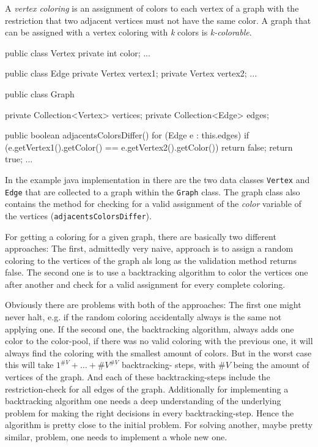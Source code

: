 \documentclass[conference]{IEEEtran}
\begin{document}
A \emph{vertex coloring} is an assignment of colors to each vertex of a graph
with the restriction that two adjacent vertices must not have the same color.
A graph that can be assigned with a vertex coloring with \emph{k} colors is
\emph{k-colorable}.

\begin{javalst}[label=lst:graph_coloring,caption=Graph-coloring example]
public class Vertex {
  private int color;
  ...
}

public class Edge {
  private Vertex vertex1;
  private Vertex vertex2;
  ...
}

public class Graph {
  private Collection<Vertex> vertices;
  private Collection<Edge> edges;

  public boolean adjacentsColorsDiffer() {
    for (Edge e : this.edges)
      if (e.getVertex1().getColor() == e.getVertex2().getColor())
        return false;
    return true;
  }
  ...
}
\end{javalst}

In the example java implementation in  there are
the two data classes \texttt{Vertex} and \texttt{Edge} that are collected to a
graph within the \texttt{Graph} class. The graph class also contains the
method for checking for a valid assignment of the \emph{color} variable of the
vertices (\texttt{adjacentsColorsDiffer}).

For getting a coloring for a given graph, there are basically two different
approaches: The first, admittedly very naive, approach is to assign a random
coloring to the vertices of the graph als long as the validation method
returns false. The second one is to use a backtracking algorithm to color the
vertices one after another and check for a valid assignment for every complete
coloring.

Obviously there are problems with both of the approaches: The first one might
never halt, e.g. if the random coloring accidentally always is the same not
applying one. If the second one, the backtracking algorithm, always adds one
color to the color-pool, if there was no valid coloring with the previous one,
it will always find the coloring with the smallest amount of colors. But in the
worst case this will take \(1^{\#V} + \ldots + \#V^{\#V} \) backtracking-%
steps, with \(\#V\) being the amount of vertices of the graph. And each of
these backtracking-steps include the restriction-check for all edges of the
graph. Additionally for implementing a backtracking algorithm one needs a deep
understanding of the underlying problem for making the right decisions in
every backtracking-step. Hence the algorithm is pretty close to the initial
problem. For solving another, maybe pretty similar, problem, one needs to
implement a whole new one.
\end{document}
